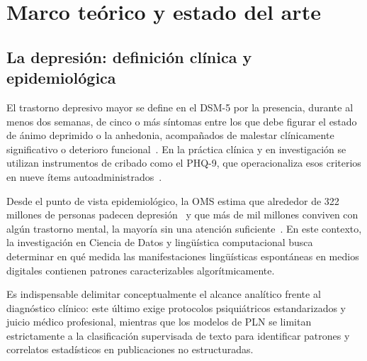 \documentclass[12pt,a4paper]{article}
\begin{document}
\newpage
\section{Marco teórico y estado del arte}
\label{sec:marco}

\subsection{La depresión: definición clínica y epidemiológica}
El trastorno depresivo mayor se define en el DSM-5 por la presencia, durante al menos dos semanas, de cinco o más síntomas entre los que debe figurar el estado de ánimo deprimido o la anhedonia, acompañados de malestar clínicamente significativo o deterioro funcional~\cite{apa2013dsm5}. En la práctica clínica y en investigación se utilizan instrumentos de cribado como el PHQ-9, que operacionaliza esos criterios en nueve ítems autoadministrados~\cite{kroenke2001phq9}.

Desde el punto de vista epidemiológico, la OMS estima que alrededor de 322 millones de personas padecen depresión~\cite{who2026depression} y que más de mil millones conviven con algún trastorno mental, la mayoría sin una atención suficiente~\cite{who2025mentalhealth}. En este contexto, la investigación en Ciencia de Datos y lingüística computacional busca determinar en qué medida las manifestaciones lingüísticas espontáneas en medios digitales contienen patrones caracterizables algorítmicamente.

Es indispensable delimitar conceptualmente el alcance analítico frente al diagnóstico clínico: este último exige protocolos psiquiátricos estandarizados y juicio médico profesional, mientras que los modelos de PLN se limitan estrictamente a la clasificación supervisada de texto para identificar patrones y correlatos estadísticos en publicaciones no estructuradas.
\end{document}
